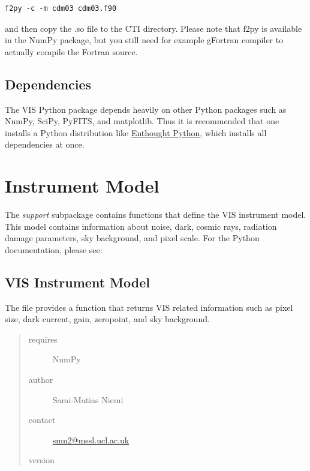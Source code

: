 \documentclass[a4paper,12pt,english]{sphinxmanual}
\begin{document}
\begin{Verbatim}[commandchars=\\\{\}]
f2py -c -m cdm03 cdm03.f90
\end{Verbatim}

and then copy the .so file to the CTI directory. Please note that f2py is available in the NumPy package,
but you still need for example gFortran compiler to actually compile the Fortran source.


\section{Dependencies}
\label{index:dependencies}
The VIS Python package depends heavily on other Python packages such as NumPy, SciPy, PyFITS, and matplotlib.
Thus it is recommended that one installs a Python distribution like \href{http://www.enthought.com/}{Enthought Python},
which installs all dependencies at once.


\chapter{Instrument Model}
\label{index:instrument-model}
The \emph{support} subpackage contains functions that define the VIS instrument model. This model contains information
about noise, dark, cosmic rays, radiation damage parameters, sky background, and pixel scale. For the Python
documentation, please see:
\label{instrument:module-support.VISinstrumentModel}

\section{VIS Instrument Model}
\label{instrument:vis-instrument-model}\label{instrument::doc}
The file provides a function that returns VIS related information such as pixel
size, dark current, gain, zeropoint, and sky background.
\begin{quote}\begin{description}
\item[{requires}] \leavevmode
NumPy

\item[{author}] \leavevmode
Sami-Matias Niemi

\item[{contact}] \leavevmode
\href{mailto:smn2@mssl.ucl.ac.uk}{smn2@mssl.ucl.ac.uk}

\item[{version}] 

\end{description}\end{quote}
\end{document}

